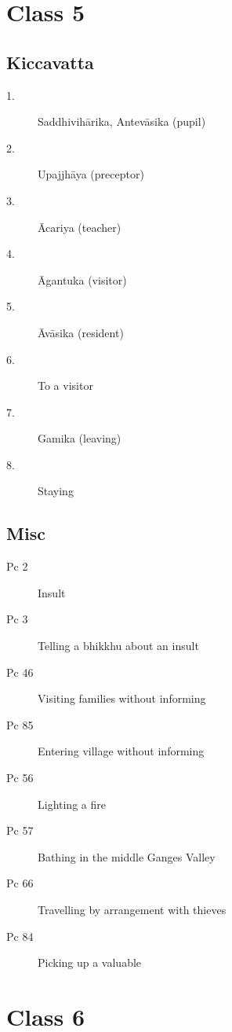 \documentclass[11pt,oneside]{memoir}
\begin{document}
\chapter{Class 5}

\begin{multicols}{2}

\section{Kiccavatta}

\begin{description}
\item[1.] Saddhivihārika, Antevāsika (pupil)
\item[2.] Upajjhāya (preceptor)
\item[3.] Ācariya (teacher)
\item[4.] Āgantuka (visitor)
\item[5.] Āvāsika (resident)
\item[6.] To a visitor
\item[7.] Gamika (leaving)
\item[8.] Staying
\end{description}

\columnbreak

\section{Misc}

\begin{description}
\item[Pc 2] Insult
\item[Pc 3] Telling a bhikkhu about an insult
\item[Pc 46] Visiting families without informing
\item[Pc 85] Entering village without informing
\item[Pc 56 \orig] Lighting a fire%
\item[Pc 57 \orig] Bathing in the middle Ganges Valley%
\item[Pc 66] Travelling by arrangement with thieves
\item[Pc 84 \orig] Picking up a valuable%
\end{description}

\end{multicols}

\chapter{Class 6}
\end{document}
